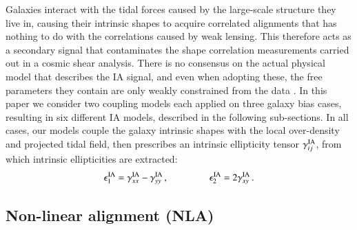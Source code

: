 \documentclass[useAMS,usenatbib]{mn2e}
\begin{document}
Galaxies interact with the tidal forces caused by the large-scale structure  they live in, causing their intrinsic shapes to acquire correlated alignments that has nothing to do with the correlations caused by weak lensing. This therefore acts as a secondary signal that contaminates the shape correlation measurements carried out in a cosmic shear analysis. There is no consensus on the actual physical model that describes the IA signal, and even when adopting these, the free parameters they contain are only weakly constrained from the data \citep[see][for reviews]{IA_review1, IA_review2}.  %
In this paper we consider two coupling models each applied on three galaxy bias cases, resulting in six different IA models, described in the following sub-sections. In all cases, our models couple the galaxy intrinsic shapes with the local over-density and projected tidal field, then prescribes an intrinsic ellipticity tensor $\gamma_{ij}^{\rm IA}$, from which intrinsic  ellipticities are extracted:
 \begin{eqnarray}
\epsilon_{1}^{\rm IA} = \gamma_{xx}^{\rm IA} - \gamma_{yy}^{\rm IA} \, , \hspace{1.5cm}\epsilon_{2}^{\rm IA} = 2 \gamma_{xy}^{\rm IA}\, .
\label{eq:tidal_th_deltaNLA}
\end{eqnarray}


 
\subsection{Non-linear alignment (NLA)}
\end{document}
